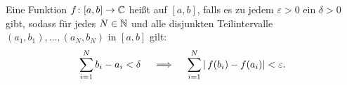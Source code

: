 Eine Funktion $f\colon[a,b]\to \mathbb{C}$ heißt  auf $[a,b]$, \pause falls es zu jedem $\varepsilon>0$ ein $\delta>0$ gibt, \pause sodass für jedes $N\in\mathbb{N}$ \pause und alle disjunkten Teilintervalle $(a_1,b_1),\dots,(a_N,b_N)$ in $[a,b]$ gilt: \pause
\begin{equation*}
    \sum_{i=1}^N b_i - a_i <\delta \quad \implies \quad \sum_{i=1}^N \left| \,f(b_i) - f(a_i)\right|<\varepsilon.
\end{equation*}